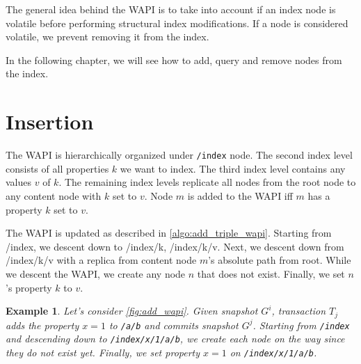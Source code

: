 \documentclass[abstracton,12pt]{scrreprt}
\newtheorem{example}{Example}
\begin{document}
The general idea behind the WAPI is to take into account if an index node is volatile before performing structural index modifications.
If a node is considered volatile, we prevent removing it from the index.

In the following chapter, we will see how to add, query and remove nodes from the index.

\section{Insertion}

The WAPI is hierarchically organized under \texttt{/index} node.
The second index level consists of all properties $k$ we want to index.
The third index level contains any values $v$ of $k$.
The remaining index levels replicate all nodes from the root node to any content node with $k$ set to $v$.
Node $m$ is added to the WAPI iff $m$ has a property $k$ set to $v$.

The WAPI is updated as described in \cref{algo:add_triple_wapi}.
Starting from /index, we descent down to /index/k, /index/k/v.
Next, we descent down from /index/k/v with a replica from content node $m$'s absolute path from root.
While we descent the WAPI, we create any node $n$ that does not exist.
Finally, we set $n$'s property $k$ to $v$.

\begin{example}
    Let's consider \cref{fig:add_wapi}.
    Given snapshot $G^i$, transaction $T_j$ adds the property $x=1$ to \texttt{/a/b} and commits snapshot $G^j$.
    Starting from \texttt{/index} and descending down to \texttt{/index/x/1/a/b}, we create each node on the way since they do not exist yet.
    Finally, we set property $x=1$ on \texttt{/index/x/1/a/b}.
\end{example}
\end{document}
